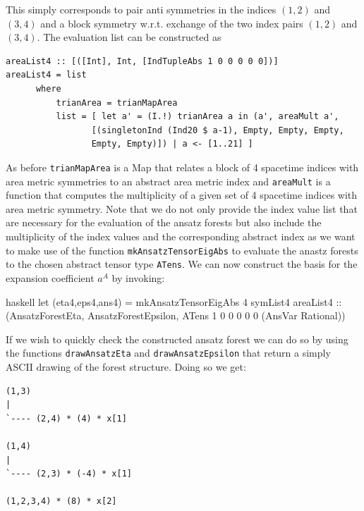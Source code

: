 \documentclass[a4paper,12pt, DIV=14, BCOR=5mm, twoside, headsepline]{scrbook}
\begin{document}
This simply corresponds to pair anti symmetries in the indices $(1,2)$ and $(3,4)$ and a block symmetry w.r.t. exchange of the two index pairs $(1,2)$ and $(3,4)$. The evaluation list can be constructed as

\begin{samepage}
\begin{verbatim}
areaList4 :: [([Int], Int, [IndTupleAbs 1 0 0 0 0 0])]
areaList4 = list
      where
          trianArea = trianMapArea
          list = [ let a' = (I.!) trianArea a in (a', areaMult a',
                 [(singletonInd (Ind20 $ a-1), Empty, Empty, Empty,
                 Empty, Empty)]) | a <- [1..21] ]
\end{verbatim} 
\end{samepage}

As before \texttt{trianMapArea} is a Map that relates a block of 4 spacetime indices with area metric symmetries to an abstract area metric index and \texttt{areaMult} is a function that computes the multiplicity of a given set of 4 spacetime indices with area metric symmetry. Note that we do not only provide the index value list that are necessary for the evaluation of the ansatz forests but also include the multiplicity of the index values and the corresponding abstract index as we want to make use of the function \texttt{mkAnsatzTensorEigAbs} to evaluate the anastz forests to the chosen abstract tensor type \texttt{ATens}. We can now construct the basis for the expansion coefficient $a^{A}$ by invoking:

\begin{center}
\begin{cminted}{haskell}
let (eta4,eps4,ans4) = mkAnsatzTensorEigAbs 4 symList4 areaList4 :: 
                         (AnsatzForestEta, AnsatzForestEpsilon,
                         ATens 1 0 0 0 0 0 (AnsVar Rational))
\end{cminted}
\end{center}

If we wish to quickly check the constructed ansatz forest we can do so by using the functions \texttt{drawAnsatzEta} and \texttt{drawAnsatzEpsilon} that return a simply ASCII drawing of the forest structure. Doing so we get:

\begin{center}
\begin{BVerbatim}
(1,3)
|
`---- (2,4) * (4) * x[1]

(1,4)
|
`---- (2,3) * (-4) * x[1]

(1,2,3,4) * (8) * x[2]
\end{BVerbatim}
\end{center}
\end{document}
